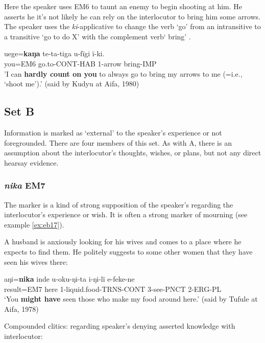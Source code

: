 \documentclass[output=paper]{langsci/langscibook}
\begin{document}
Here the speaker uses EM6 to taunt an enemy to begin shooting at him. He asserts he it’s not likely he can rely on the interlocutor to bring him some arrows.  The speaker uses the \textit{ki}-applicative to change the verb ‘go’ from an  intransitive to a transitive ‘go to do X’ with the complement verb‘ bring’ .

\begin{exe}
	\ex \label{ex:eb12}
	\gll uege=\textbf{kaŋa} te-ta-tiga u-fïgi ï-ki.\\
	you=EM6 go.to-CONT-HAB 1-arrow bring-IMP\\
	\trans  'I can \textbf{hardly count on you} to always go to bring my arrows to me (=i.e., ‘shoot me’).' (said by Kudyu at Aifa, 1980)
\end{exe}

\subsection{Set B}

Information is marked as ‘external’ to the speaker’s experience or not foregrounded. There are four members of this set. As with A, there is an assumption about the interlocutor’s thoughts, wishes, or plans, but not any direct hearsay evidence. 

\subsubsection{\textit{nika} EM7}
The marker is a kind of strong supposition of the speaker’s regarding the interlocutor’s experience or wish.  It is often a strong marker of mourning (see example \ref{ex:eb17}).

A husband is anxiously looking for his wives and comes to a place where he expects to find them. He politely suggests to some other women that they have seen his wives there:

\begin{exe}
	\ex \label{ex:eb13}
	\gll aŋi=\textbf{nika} inde u-oku-ŋi-ta i-ŋi-lï e-feke-ne\\
	result=EM7 here 1-liquid.food-TRNS-CONT 3-see-PNCT 2-ERG-PL\\
	\trans ‘You \textbf{might have} seen those who make my food around here.’ (said by Tufule at Aifa, 1978)
\end{exe}

Compounded clitics: regarding speaker’s denying asserted knowledge with interlocutor:
\end{document}
